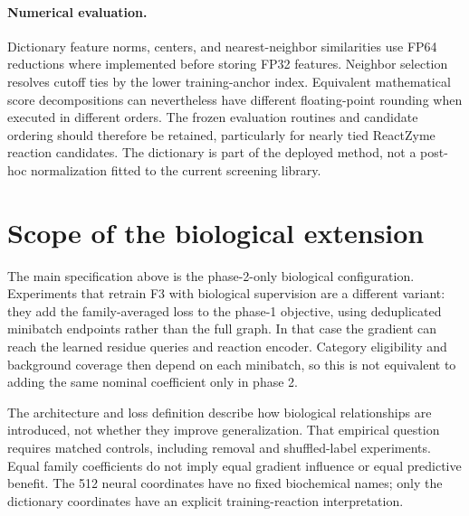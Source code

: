 \paragraph{Numerical evaluation.}
Dictionary feature norms, centers, and nearest-neighbor similarities use
FP64 reductions where implemented before storing FP32 features. Neighbor
selection resolves cutoff ties by the lower training-anchor index.
Equivalent mathematical score decompositions can nevertheless have different
floating-point rounding when executed in different orders. The frozen
evaluation routines and candidate ordering should therefore be retained,
particularly for nearly tied ReactZyme reaction candidates. The dictionary
is part of the deployed method, not a post-hoc normalization fitted to the
current screening library.

\section{Scope of the biological extension}
\label{app:v4-scope}
The main specification above is the phase-2-only biological configuration.
Experiments that retrain F3 with biological supervision are a different
variant: they add the family-averaged loss to the phase-1 objective, using
deduplicated minibatch endpoints rather than the full graph. In that case
the gradient can reach the learned residue queries and reaction encoder.
Category eligibility and background coverage then depend on each minibatch,
so this is not equivalent to adding the same nominal coefficient only in
phase 2.

The architecture and loss definition describe how biological relationships
are introduced, not whether they improve generalization. That empirical
question requires matched controls, including removal and shuffled-label
experiments. Equal family coefficients do not imply equal gradient influence
or equal predictive benefit. The 512 neural coordinates have no fixed
biochemical names; only the dictionary coordinates have an explicit
training-reaction interpretation.
